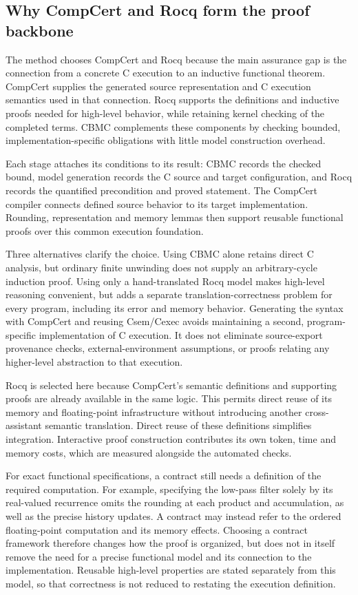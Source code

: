 \documentclass[manuscript, screen, review]{acmart}
\begin{document}
\subsection{Why CompCert and Rocq form the proof backbone}

The method chooses CompCert and Rocq because the main assurance gap is the
connection from a concrete C execution to an inductive functional theorem.
CompCert supplies the generated source representation and C execution
semantics used in that connection. Rocq supports the definitions and
inductive proofs needed for high-level behavior, while retaining kernel
checking of the completed terms. CBMC complements these components by
checking bounded, implementation-specific obligations with little model
construction overhead.

Each stage attaches its conditions to its result: CBMC records the checked
bound, model generation records the C source and target configuration, and
Rocq records the quantified precondition and proved statement. The CompCert
compiler connects defined source behavior to its target implementation.
Rounding, representation and memory lemmas then support reusable functional
proofs over this common execution foundation.

Three alternatives clarify the choice. Using CBMC alone retains direct C
analysis, but ordinary finite unwinding does not supply an arbitrary-cycle
induction proof. Using only a hand-translated Rocq model makes high-level
reasoning convenient, but adds a separate translation-correctness problem
for every program, including its error and memory behavior. Generating the
syntax with CompCert and reusing Csem/Cexec avoids maintaining a second,
program-specific implementation of C execution. It does not eliminate
source-export provenance checks, external-environment assumptions, or
proofs relating any higher-level abstraction to that execution.

Rocq is selected here because CompCert's semantic definitions and supporting
proofs are already available in the same logic. This permits direct reuse
of its memory and floating-point infrastructure without introducing another
cross-assistant semantic translation. Direct reuse of these definitions simplifies integration. Interactive
proof construction contributes its own token, time and memory costs,
which are measured alongside the automated checks.

For exact functional specifications, a contract still needs a definition
of the required computation. For example, specifying the low-pass filter solely by its real-valued
recurrence omits the rounding at each product and accumulation, as well
as the precise history updates. A contract may instead refer to the
ordered floating-point computation and its memory effects. Choosing
a contract framework therefore changes how the proof is organized, but
does not in itself remove the need for a precise functional model and its
connection to the implementation. Reusable high-level properties are stated
separately from this model, so that correctness is not reduced to restating
the execution definition.
\end{document}
